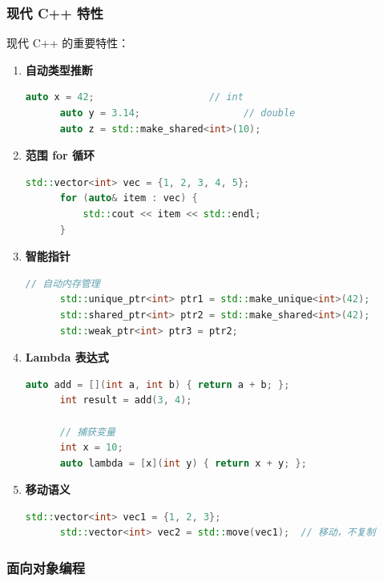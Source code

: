 \subsubsection{现代 C++ 特性}


现代 C++ 的重要特性：

\begin{enumerate}
  \item \textbf{自动类型推断}
    \begin{lstlisting}[language=C++]
      auto x = 42;                    // int
      auto y = 3.14;                  // double
      auto z = std::make_shared<int>(10);
    \end{lstlisting}

  \item \textbf{范围 for 循环}
    \begin{lstlisting}[language=C++]
      std::vector<int> vec = {1, 2, 3, 4, 5};
      for (auto& item : vec) {
          std::cout << item << std::endl;
      }
    \end{lstlisting}

  \item \textbf{智能指针}
    \begin{lstlisting}[language=C++]
      // 自动内存管理
      std::unique_ptr<int> ptr1 = std::make_unique<int>(42);
      std::shared_ptr<int> ptr2 = std::make_shared<int>(42);
      std::weak_ptr<int> ptr3 = ptr2;
    \end{lstlisting}

  \item \textbf{Lambda 表达式}
    \begin{lstlisting}[language=C++]
      auto add = [](int a, int b) { return a + b; };
      int result = add(3, 4);

      // 捕获变量
      int x = 10;
      auto lambda = [x](int y) { return x + y; };
    \end{lstlisting}

  \item \textbf{移动语义}
    \begin{lstlisting}[language=C++]
      std::vector<int> vec1 = {1, 2, 3};
      std::vector<int> vec2 = std::move(vec1);  // 移动，不复制
    \end{lstlisting}
\end{enumerate}

\subsubsection{面向对象编程}

